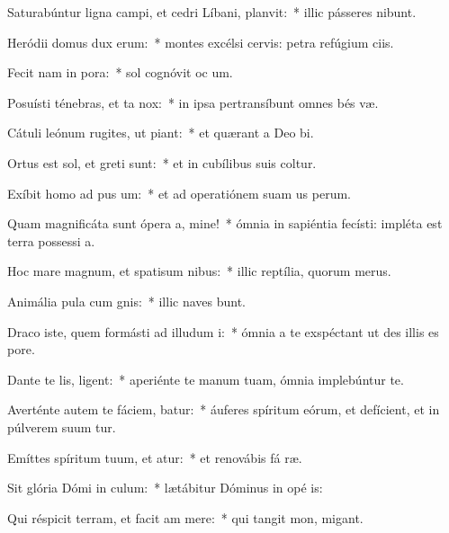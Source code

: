 \item Saturabúntur ligna campi, et cedri Líbani,  planvit:~* illic pásseres nibunt.
\item Heródii domus dux  erum:~* montes excélsi cervis: petra refúgium ciis.
\item Fecit nam in pora:~* sol cognóvit oc um.
\item Posuísti ténebras, et ta  nox:~* in ipsa pertransíbunt omnes bés væ.
\item Cátuli leónum rugites, ut piant:~* et quærant a Deo  bi.
\item Ortus est sol, et greti sunt:~* et in cubílibus suis coltur.
\item Exíbit homo ad pus um:~* et ad operatiónem suam us  perum.
\item Quam magnificáta sunt ópera a, mine!~* ómnia in sapiéntia fecísti: impléta est terra possessi a.
\item Hoc mare magnum, et spatisum nibus:~* illic reptília, quorum   merus.
\item Animália pula cum gnis:~* illic naves bunt.
\item Draco iste, quem formásti ad illudum i:~* ómnia a te exspéctant ut des illis es  pore.
\item Dante te lis, ligent:~* aperiénte te manum tuam, ómnia implebúntur te.
\item Averténte autem te fáciem, batur:~* áuferes spíritum eórum, et defícient, et in púlverem suum tur.
\item Emíttes spíritum tuum, et atur:~* et renovábis fá ræ.
\item Sit glória Dómi in culum:~* lætábitur Dóminus in opé is:
\item Qui réspicit terram, et facit am mere:~* qui tangit mon,  migant.
